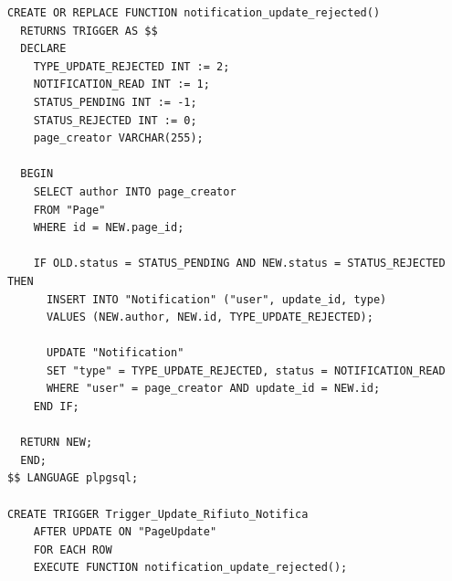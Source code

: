 \documentclass{article}
\begin{document}
	\begin{lstlisting}[style=SQL]
CREATE OR REPLACE FUNCTION notification_update_rejected()
  RETURNS TRIGGER AS $$
  DECLARE
	TYPE_UPDATE_REJECTED INT := 2;
	NOTIFICATION_READ INT := 1;
	STATUS_PENDING INT := -1;
	STATUS_REJECTED INT := 0;
	page_creator VARCHAR(255);
				
  BEGIN
	SELECT author INTO page_creator
	FROM "Page"
	WHERE id = NEW.page_id;
		
	IF OLD.status = STATUS_PENDING AND NEW.status = STATUS_REJECTED THEN
	  INSERT INTO "Notification" ("user", update_id, type)
	  VALUES (NEW.author, NEW.id, TYPE_UPDATE_REJECTED);
		
	  UPDATE "Notification"
  	  SET "type" = TYPE_UPDATE_REJECTED, status = NOTIFICATION_READ
	  WHERE "user" = page_creator AND update_id = NEW.id;
	END IF;
		
  RETURN NEW;
  END;
$$ LANGUAGE plpgsql;
		
CREATE TRIGGER Trigger_Update_Rifiuto_Notifica
	AFTER UPDATE ON "PageUpdate"
	FOR EACH ROW
	EXECUTE FUNCTION notification_update_rejected();
\end{lstlisting}
	
	
	
\end{document}
